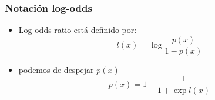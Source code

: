 \begin{frame}
    \frametitle{Notación log-odds}

    \begin{itemize}
        \item Log odds ratio está definido por:
        \begin{equation*}
            l(x) = \log \dfrac{p(x)}{1-p(x)}
        \end{equation*}
        \item podemos de despejar $p(x)$
        \begin{equation*}
            p(x) = 1 - \dfrac{1}{1 + \exp l(x)}
        \end{equation*}
    \end{itemize}
    
\end{frame}

